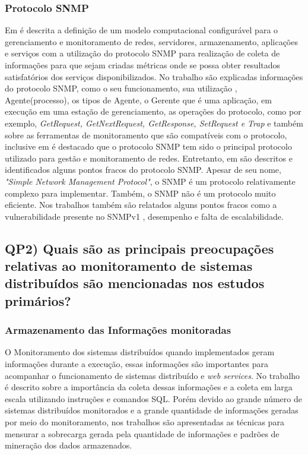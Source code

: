 \subsubsection{Protocolo SNMP}
\label{snmpDescription}

Em \cite{deGeus} é descrita a definição de um modelo computacional configurável para o gerenciamento e monitoramento de redes, servidores, armazenamento, aplicações e serviços com a utilização do protocolo SNMP para realização de coleta de informações para que sejam criadas métricas onde se possa obter resultados satisfatórios dos serviços disponibilizados. No  trabalho \cite{daSilva} são explicadas informações do protocolo SNMP, como o seu funcionamento, sua utilização , Agente(processo), os tipos de Agente, o Gerente que é uma aplicação, em execução em uma estação de gerenciamento, as operações do protocolo, como por exemplo, \textit{GetRequest, 	GetNextRequest,  GetResponse,  SetRequest  e Trap} e também sobre as ferramentas de monitoramento que são compatíveis com o protocolo, inclusive em \cite{Fraga} é destacado que o protocolo SNMP tem sido o principal protocolo utilizado para gestão e monitoramento de redes. Entretanto, em \cite{deMello} são descritos e identificados alguns pontos fracos do protocolo \acrshort{SNMP}. Apesar  de  seu  nome,  \textit{"Simple  Network  Management  Protocol"},  o  SNMP  é  um protocolo  relativamente  complexo  para  implementar.  Também,  o  SNMP  não  é  um protocolo muito eficiente. Nos trabalhos \cite{phan2009cryptanalysis,subramanyan2000scalable} também são relatados alguns pontos fracos como a vulnerabilidade presente no SNMPv1 , desempenho e falta de escalabilidade.

\subsection{QP2) Quais são as principais preocupações relativas ao monitoramento de sistemas distribuídos são mencionadas nos estudos primários?}

\subsubsection{Armazenamento das Informações monitoradas}

O Monitoramento dos sistemas distribuídos quando implementados geram informações durante a execução, essas informações são importantes para acompanhar o funcionamento de sistemas distribuído e \textit{web services}. No trabalho \cite{phan2009cryptanalysis} é descrito sobre a importância da coleta dessas informações e a coleta em larga escala utilizando instruções e comandos SQL. Porém devido ao grande número de sistemas distribuídos monitorados e a grande quantidade de informações geradas por meio do monitoramento, nos trabalhos \cite{abdu1996monitoring,hirate2009profiling} são apresentadas as técnicas para mensurar a sobrecarga gerada pela quantidade de informações e padrões de mineração dos dados armazenados.  

